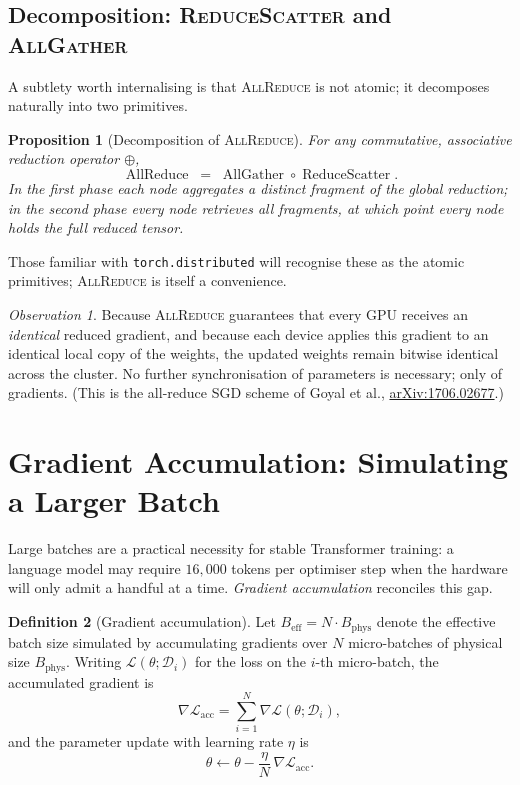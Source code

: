 \documentclass[11pt,a4paper]{article}
\theoremstyle{definition}
\newtheorem{definition}{Definition}[section]
\theoremstyle{remark}
\newtheorem*{observation}{Observation}
\theoremstyle{plain}
\newtheorem{proposition}[definition]{Proposition}
\newcommand{\grad}{\nabla}
\newcommand{\LL}{\mathcal{L}}
\newcommand{\DD}{\mathcal{D}}
\DeclareMathOperator*{\AllReduce}{AllReduce}
\DeclareMathOperator*{\AllGather}{AllGather}
\DeclareMathOperator*{\ReduceScatter}{ReduceScatter}
\begin{document}
\subsection{Decomposition: \textsc{ReduceScatter} and \textsc{AllGather}}

A subtlety worth internalising is that \textsc{AllReduce} is not atomic;
it decomposes naturally into two primitives.

\begin{proposition}[Decomposition of \textsc{AllReduce}]
For any commutative, associative reduction operator $\oplus$,
\begin{equation}
\AllReduce \;=\; \AllGather \circ \ReduceScatter.
\end{equation}
In the first phase each node aggregates a distinct fragment of the global
reduction; in the second phase every node retrieves all fragments, at
which point every node holds the full reduced tensor.
\end{proposition}

Those familiar with \texttt{torch.distributed} will recognise these as
the atomic primitives; \textsc{AllReduce} is itself a convenience.

\begin{observation}
Because \textsc{AllReduce} guarantees that every GPU receives an
\emph{identical} reduced gradient, and because each device applies this
gradient to an identical local copy of the weights, the updated weights
remain bitwise identical across the cluster. No further synchronisation
of parameters is necessary; only of gradients. (This is the all-reduce
SGD scheme of Goyal et al.,
\href{https://arxiv.org/abs/1706.02677}{arXiv:1706.02677}.)
\end{observation}

\section{Gradient Accumulation: Simulating a Larger Batch}

Large batches are a practical necessity for stable Transformer training:
a language model may require $16{,}000$ tokens per optimiser step when
the hardware will only admit a handful at a time. \emph{Gradient
accumulation} reconciles this gap.

\begin{definition}[Gradient accumulation]
Let $B_{\mathrm{eff}} = N \cdot B_{\mathrm{phys}}$ denote the effective
batch size simulated by accumulating gradients over $N$ micro-batches of
physical size $B_{\mathrm{phys}}$. Writing $\LL(\theta; \DD_i)$ for the
loss on the $i$-th micro-batch, the accumulated gradient is
\begin{equation}
\grad \LL_{\mathrm{acc}} = \sum_{i=1}^{N} \grad \LL(\theta;\DD_i),
\end{equation}
and the parameter update with learning rate $\eta$ is
\begin{equation}
\theta \leftarrow \theta - \frac{\eta}{N}\, \grad \LL_{\mathrm{acc}}.
\end{equation}
\end{definition}
\end{document}
